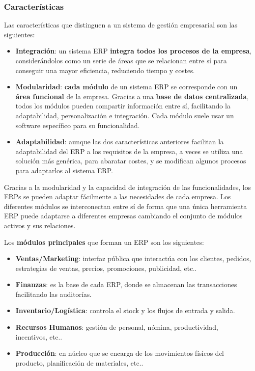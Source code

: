 \subsubsection{Características}
Las características que distinguen a un sistema de gestión empresarial son las siguientes:

\begin{itemize}
    \item \textbf{Integración}: un sistema ERP \textbf{integra todos los procesos de la empresa}, considerándolos como un serie de áreas que se relacionan entre sí para conseguir una mayor eficiencia, reduciendo tiempo y costes.
    \item \textbf{Modularidad}: \textbf{cada módulo} de un sistema ERP se corresponde con un \textbf{área funcional} de la empresa. Gracias a una \textbf{base de datos centralizada}, todos los módulos pueden compartir información entre sí, facilitando la adaptabilidad, personalización e integración. Cada módulo suele usar un software específico para su funcionalidad.
    \item \textbf{Adaptabilidad}: aunque las dos características anteriores facilitan la adaptabilidad del ERP a los requisitos de la empresa, a veces se utiliza una solución más genérica, para abaratar costes, y se modifican algunos procesos para adaptarlos al sistema ERP.
\end{itemize}

Gracias a la modularidad y la capacidad de integración de las funcionalidades, los ERPs se pueden adaptar fácilmente a las necesidades de cada empresa. Los diferentes módulos se interconectan entre sí de forma que una única herramienta ERP puede adaptarse a diferentes empresas cambiando el conjunto de módulos activos y sus relaciones.

Los \textbf{módulos principales} que forman un ERP son los siguientes:

\begin{itemize}
    \item \textbf{Ventas/Marketing}: interfaz pública que interactúa con los clientes, pedidos, estrategias de ventas, precios, promociones, publicidad, etc..
    \item \textbf{Finanzas}: es la base de cada ERP, donde se almacenan las transacciones facilitando las auditorías.
    \item \textbf{Inventario/Logística}: controla el stock y los flujos de entrada y salida.
    \item \textbf{Recursos Humanos}: gestión de personal, nómina, productividad, incentivos, etc..
    \item \textbf{Producción}: en núcleo que se encarga de los movimientos físicos del producto, planificación de materiales, etc..
\end{itemize}

